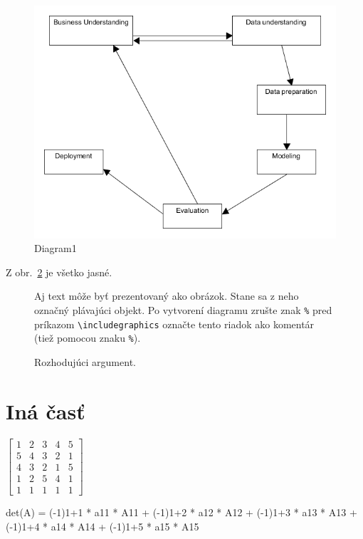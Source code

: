 \documentclass[10pt,twocolumn,twoside,slovak,a4paper]{article}
\begin{document}
\begin{figure}[b]
\includegraphics[scale=0.4]{diagram1.png}
  \caption{ Diagram1}
  \label{fig:Diagram1}
\end{figure}

Z obr.~\ref{f:rozhod} je všetko jasné. 

\begin{figure}[tbh]
\centering
Aj text môže byť prezentovaný ako obrázok. Stane sa z neho označný plávajúci objekt. Po vytvorení diagramu zrušte znak \texttt{\%} pred príkazom \verb|\includegraphics| označte tento riadok ako komentár (tiež pomocou znaku \texttt{\%}).
\caption{Rozhodujúci argument.}
\label{f:rozhod}
\end{figure}



\section{Iná časť} \label{ina}
$\begin{bmatrix}
1 & 2 & 3 & 4 & 5\\
5 & 4 & 3 & 2 & 1\\
4 & 3 & 2 & 1 & 5\\
1 & 2 & 5 & 4 & 1\\
 1& 1 & 1 & 1 & 1

\end{bmatrix}$


det(A) =
(-1)1+1 * a11 * A11 + (-1)1+2 * a12 * A12 + (-1)1+3 * a13 * A13 + (-1)1+4 * a14 * A14 + (-1)1+5 * a15 * A15
\end{document}
